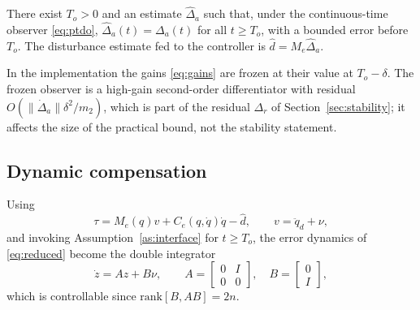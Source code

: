 \begin{assumption}\label{as:interface}
There exist $T_o>0$ and an estimate $\hat\Delta_a$ such that, under the
continuous-time observer \eqref{eq:ptdo}, $\hat\Delta_a(t)=\Delta_a(t)$ for all
$t\ge T_o$, with a bounded error before $T_o$. The disturbance estimate fed to
the controller is $\hat d=M_e\hat\Delta_a$.
\end{assumption}

\begin{remark}\label{rem:frozen}
In the implementation the gains \eqref{eq:gains} are frozen at their value at
$T_o-\delta$. The frozen observer is a high-gain second-order differentiator
with residual $O(\|\dot\Delta_a\|\delta^2/m_2)$, which is part of the residual
$\Delta_r$ of Section~\ref{sec:stability}; it affects the size of the practical
bound, not the stability statement.
\end{remark}

\subsection{Dynamic compensation}
Using
\begin{equation}
 \tau=M_e(q)v+C_e(q,\dot q)\dot q-\hat d,
 \qquad v=\ddot q_d+\nu,
 \label{eq:computed_torque}
\end{equation}
and invoking Assumption~\ref{as:interface} for $t\ge T_o$, the error dynamics
of \eqref{eq:reduced} become the double integrator
\begin{equation}
 \dot z=Az+B\nu,\qquad
 A=\begin{bmatrix}0&I\\0&0\end{bmatrix},\quad
 B=\begin{bmatrix}0\\I\end{bmatrix},
 \label{eq:error_channel}
\end{equation}
which is controllable since $\mathrm{rank}[B,AB]=2n$.


